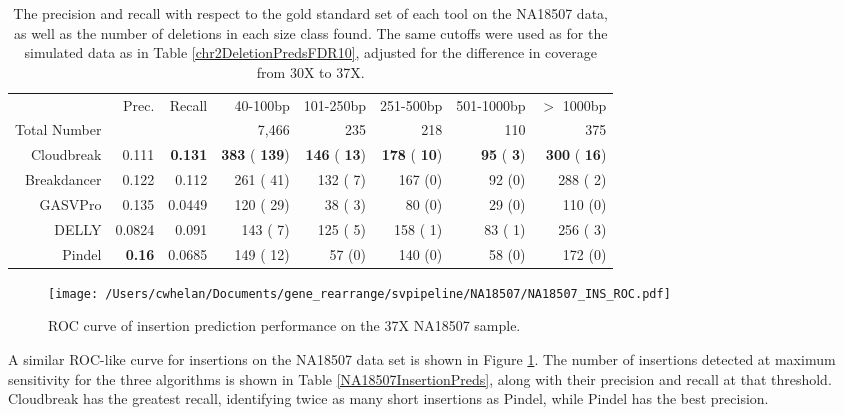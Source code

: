 \documentclass[11pt]{article}
\begin{document}
\begin{table}[t]
\begin{center}
\begin{tabular}{rrr|rrrrr}
  \hline
 & Prec. & Recall & 40-100bp & 101-250bp & 251-500bp & 501-1000bp & $>$ 1000bp \\ 
Total Number & & & 7,466 & 235 & 218 & 110 & 375 \\
  \hline
Cloudbreak & 0.111 & \textbf{0.131} & \textbf{ 383} (\textbf{ 139})  & \textbf{ 146} (\textbf{  13}) &  \textbf{ 178} (\textbf{  10}) & \textbf{  95} (\textbf{   3}) & \textbf{ 300} (\textbf{  16}) \\ 
Breakdancer & 0.122 & 0.112 &  261 (  41)  &  132 (   7) &   167 (0) &   92 (0) &  288 (   2) \\  
  GASVPro & 0.135 & 0.0449 &  120 (  29)  &   38 (   3) &    80 (0) &   29 (0) &  110 (0) \\ 
  DELLY & 0.0824 & 0.091 &  143 (   7)  &  125 (   5) &   158 (   1) &   83 (   1) &  256 (   3) \\ 
  Pindel & \textbf{0.16} & 0.0685 &  149 (  12)  &   57 (0) &   140 (0) &   58 (0) &  172 (0) \\ 
   \hline
\end{tabular}
\end{center}
\caption{The precision and recall with respect to the gold standard set of each tool on the NA18507 data, as well as the number of deletions in each size class found. The same cutoffs were used as for the simulated data as in Table \ref{chr2DeletionPredsFDR10}, adjusted for the difference in coverage from 30X to 37X.}
\label{NA18507DeletionPreds}
\end{table}

\begin{figure}[t]
\centering
\texttt{[image: /Users/cwhelan/Documents/gene\_rearrange/svpipeline/NA18507/NA18507\_INS\_ROC.pdf]}
\caption{ROC curve of insertion prediction performance on the 37X NA18507 sample.}
\label{NA18507InsertionsRoc}
\end{figure}

A similar ROC-like curve for insertions on the NA18507 data set is shown in Figure \ref{NA18507InsertionsRoc}. The number of insertions detected at maximum sensitivity for the three algorithms is shown in Table \ref{NA18507InsertionPreds}, along with their precision and recall at that threshold. Cloudbreak has the greatest recall, identifying twice as many short insertions as Pindel, while Pindel has the best precision.
\end{document}

